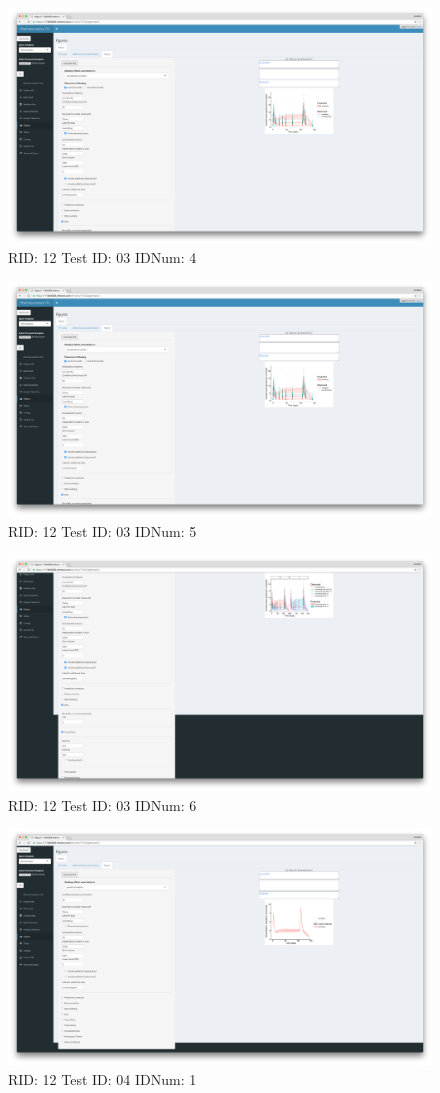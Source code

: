 \begin{figure}[H]
\includegraphics[width=.8\textwidth]{screencaps/12-03-4.png}
\caption{RID: 12 Test ID: 03 IDNum: 4}
\end{figure}
\begin{figure}[H]
\includegraphics[width=.8\textwidth]{screencaps/12-03-5.png}
\caption{RID: 12 Test ID: 03 IDNum: 5}
\end{figure}
\begin{figure}[H]
\includegraphics[width=.8\textwidth]{screencaps/12-03-6.png}
\caption{RID: 12 Test ID: 03 IDNum: 6}
\end{figure}
\begin{figure}[H]
\includegraphics[width=.8\textwidth]{screencaps/12-04-1.png}
\caption{RID: 12 Test ID: 04 IDNum: 1}
\end{figure}
